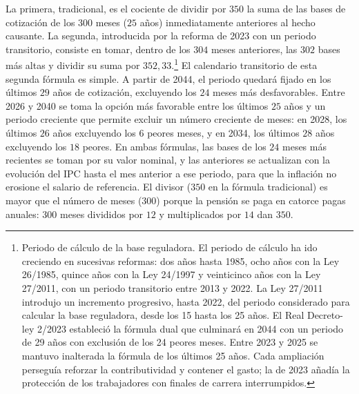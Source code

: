 \documentclass[10pt,a4paper]{article}
\begin{document}
La primera, tradicional, es el cociente de dividir por $350$ la suma de las bases de cotización de los $300$ meses ($25$ años) inmediatamente anteriores al hecho causante. La segunda, introducida por la reforma de 2023 con un periodo transitorio, consiste en tomar, dentro de los $304$ meses anteriores, las $302$ bases más altas y dividir su suma por $352,33$.\footnote{%
    Periodo de cálculo de la base reguladora. El periodo de cálculo ha ido creciendo en sucesivas reformas: dos años hasta 1985, ocho años con la Ley 26/1985, quince años con la Ley 24/1997 y veinticinco años con la Ley 27/2011, con un periodo transitorio entre 2013 y 2022. La Ley 27/2011 introdujo un incremento progresivo, hasta 2022, del periodo considerado para calcular la base reguladora, desde los 15 hasta los 25 años. El Real Decreto-ley 2/2023 estableció la fórmula dual que culminará en 2044 con un periodo de 29 años con exclusión de los 24 peores meses. Entre 2023 y 2025 se mantuvo inalterada la fórmula de los últimos 25 años. Cada ampliación perseguía reforzar la contributividad y contener el gasto; la de 2023 añadía la protección de los trabajadores con finales de carrera interrumpidos.
} El calendario transitorio de esta segunda fórmula es simple. A partir de 2044, el periodo quedará fijado en los últimos $29$ años de cotización, excluyendo los $24$ meses más desfavorables. Entre 2026 y 2040 se toma la opción más favorable entre los últimos $25$ años y un periodo creciente que permite excluir un número creciente de meses: en 2028, los últimos $26$ años excluyendo los $6$ peores meses, y en 2034, los últimos $28$ años excluyendo los $18$ peores. En ambas fórmulas, las bases de los $24$ meses más recientes se toman por su valor nominal, y las anteriores se actualizan con la evolución del IPC hasta el mes anterior a ese periodo, para que la inflación no erosione el salario de referencia. El divisor ($350$ en la fórmula tradicional) es mayor que el número de meses ($300$) porque la pensión se paga en catorce pagas anuales: $300$ meses divididos por $12$ y multiplicados por $14$ dan $350$.
\end{document}
